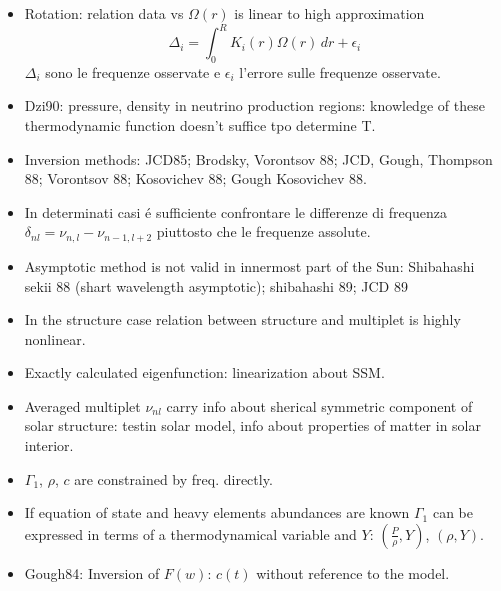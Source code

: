 \documentclass[oneside,12pt,fleqn]{memoir}
\begin{document}
{\begin{itemize}
    \item Rotation: relation data vs $\Omega(r)$ is linear to high approximation
    \begin{equation*}
    \Delta_i=\int_0^RK_i(r)\Omega(r)\,dr+\epsilon_i
    \end{equation*}
    $\Delta_i$ sono le frequenze osservate e $\epsilon_i$ l'errore sulle frequenze osservate.
    
    \item Dzi90: pressure, density in neutrino production regions: knowledge of these thermodynamic function doesn't suffice tpo determine T.
    
    \item Inversion methods: JCD85; Brodsky, Vorontsov 88; JCD, Gough, Thompson 88;  Vorontsov 88; Kosovichev 88; Gough Kosovichev 88.
    
    \item In determinati casi \'e sufficiente confrontare le differenze di frequenza $\delta_{nl}=\nu_{n,l}-\nu_{n-1,l+2}$ piuttosto che le frequenze assolute.
    
    \item Asymptotic method is not valid in innermost part of the Sun: Shibahashi sekii 88 (shart wavelength asymptotic); shibahashi 89; JCD 89 
    
    \item In the structure case relation between structure and multiplet is highly nonlinear.
    \item Exactly calculated eigenfunction: linearization about SSM.
    \item Averaged  multiplet $\nu_{nl}$ carry info about sherical symmetric component of solar structure: testin solar model, info about properties of matter in solar interior.
    \item $\Gamma_1$, $\rho$, $c$ are constrained by freq. directly.
    \item If equation of state and heavy elements abundances are known $\Gamma_1$ can be expressed in terms of a thermodynamical variable and $Y$: $(\frac{P}{\rho},Y)$, $(\rho,Y)$.
    
    \item Gough84:  Inversion of $F(w)$: $c(t)$ without reference to the model.
    

\end{itemize}}
\end{document}
